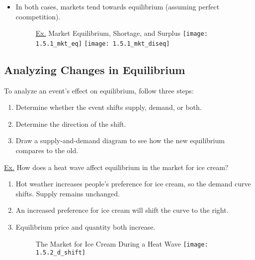 \begin{itemize}
\begin{itemize}
		\end{itemize}
		
	\item In both cases, markets tend towards equilibrium (assuming perfect coompetition).
	
	\begin{figure}[h]
	\underline{Ex.} Market Equilibrium, Shortage, and Surplus
	\centering
	\texttt{[image: 1.5.1\_mkt\_eq]}
	\centering
	\texttt{[image: 1.5.1\_mkt\_diseq]}
	\end{figure}
	
	\end{itemize}
	
\subsection{Analyzing Changes in Equilibrium}

	To analyze an event's effect on equilibrium, follow three steps:
	
	\begin{enumerate}
	
	\item Determine whether the event shifts supply, demand, or both.
	
	\item Determine the direction of the shift.
	
	\item Draw a supply-and-demand diagram to see how the new equilibrium compares to the old. 
	
	\end{enumerate}
	
	\noindent \underline{Ex.} How does a heat wave affect equilibrium in the market for ice cream?
	
	\begin{enumerate}
	
	\item Hot weather increases people's preference for ice cream, so the demand curve shifts. Supply remains unchanged.
	
	\item An increased preference for ice cream will shift the curve to the right. 
	
	\item Equilibrium price and quantity both increase. 
	
	\begin{figure}[h]
	The Market for Ice Cream During a Heat Wave
	\centering
	\texttt{[image: 1.5.2\_d\_shift]}
	\end{figure}
	
	\end{enumerate}
	
